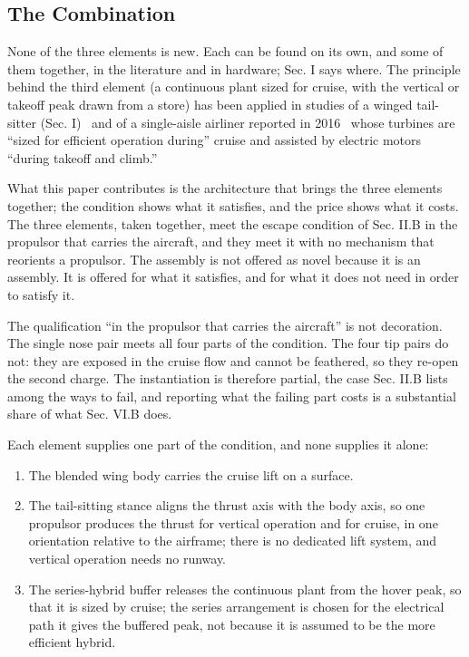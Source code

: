 \documentclass[journal]{new-aiaa}
\begin{document}
\subsection{The Combination}

None of the three elements is new. Each can be found on its own, and some of them together, in the literature and in hardware; Sec. I says where. The principle behind the third element (a continuous plant sized for cruise, with the vertical or takeoff peak drawn from a store) has been applied in studies of a winged tail-sitter (Sec. I)~\cite{r10} and of a single-aisle airliner reported in 2016~\cite{r23} whose turbines are ``sized for efficient operation during'' cruise and assisted by electric motors ``during takeoff and climb.''

What this paper contributes is the architecture that brings the three elements together; the condition shows what it satisfies, and the price shows what it costs. The three elements, taken together, meet the escape condition of Sec. II.B in the propulsor that carries the aircraft, and they meet it with no mechanism that reorients a propulsor. The assembly is not offered as novel because it is an assembly. It is offered for what it satisfies, and for what it does not need in order to satisfy it.

The qualification ``in the propulsor that carries the aircraft'' is not decoration. The single nose pair meets all four parts of the condition. The four tip pairs do not: they are exposed in the cruise flow and cannot be feathered, so they re-open the second charge. The instantiation is therefore partial, the case Sec. II.B lists among the ways to fail, and reporting what the failing part costs is a substantial share of what Sec. VI.B does.

Each element supplies one part of the condition, and none supplies it alone:

\begin{enumerate}[label=\arabic*)]
\item The blended wing body carries the cruise lift on a surface.
\item The tail-sitting stance aligns the thrust axis with the body axis, so one propulsor produces the thrust for vertical operation and for cruise, in one orientation relative to the airframe; there is no dedicated lift system, and vertical operation needs no runway.
\item The series-hybrid buffer releases the continuous plant from the hover peak, so that it is sized by cruise; the series arrangement is chosen for the electrical path it gives the buffered peak, not because it is assumed to be the more efficient hybrid.
\end{enumerate}
\end{document}
